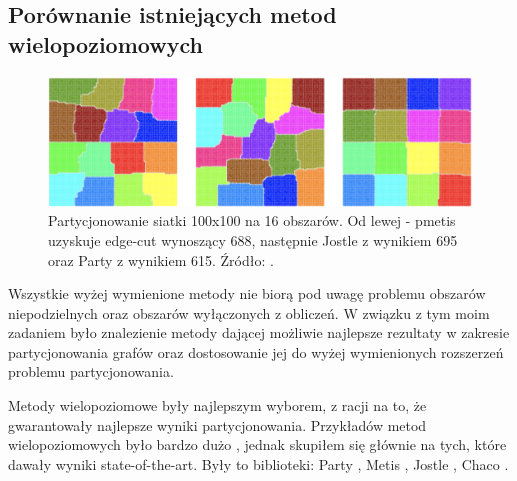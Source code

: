 \newpage

\subsection{Porównanie istniejących metod wielopoziomowych}

\begin{figure}
    \vspace{-4mm}
    \includegraphics[width=\linewidth]{images/libraries-comparision}
    \caption{Partycjonowanie siatki 100x100 na 16 obszarów. Od lewej - pmetis \cite{metis} uzyskuje edge-cut wynoszący
    688, następnie Jostle \cite{jostle} z wynikiem 695 oraz Party \cite{1364754} z wynikiem 615. Źródło: \cite{1364754}.}
    \label{im:partitioning_results}
\end{figure}

Wszystkie wyżej wymienione metody nie biorą pod uwagę problemu obszarów niepodzielnych oraz obszarów wyłączonych z obliczeń.
W związku z tym moim zadaniem było znalezienie metody dającej możliwie najlepsze rezultaty w zakresie partycjonowania grafów oraz
dostosowanie jej do wyżej wymienionych rozszerzeń problemu partycjonowania.

Metody wielopoziomowe były najlepszym wyborem, z racji na to, że gwarantowały najlepsze wyniki partycjonowania.
Przykładów metod wielopoziomowych było bardzo dużo \cite{metis, jostle, Bui1993AHF, 103500, 185177, 279334, inproceedings, 129970, 10.1145/165939.165942},
jednak skupiłem się głównie na tych, które dawały wyniki state-of-the-art. Były to biblioteki:
Party \cite{1364754}, Metis \cite{metis}, Jostle \cite{jostle}, Chaco \cite{inproceedings}.

